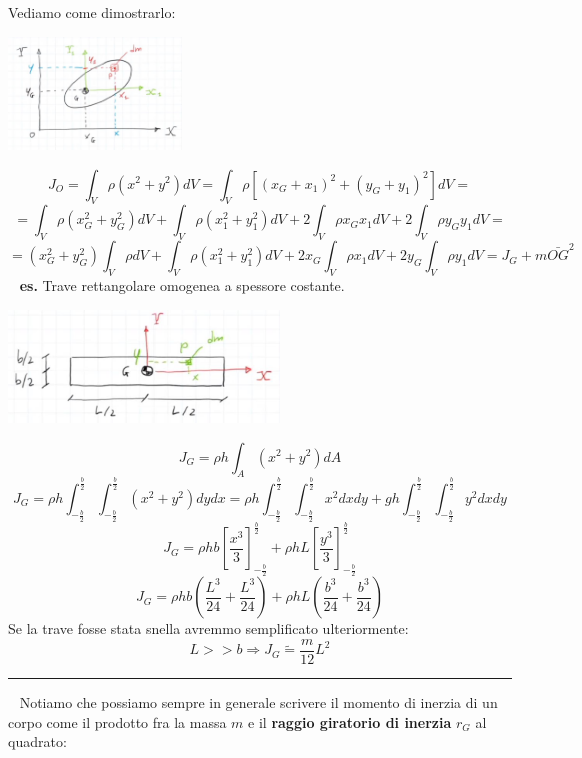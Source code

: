 \newline
Vediamo come dimostrarlo:
\begin{center}
    \includegraphics[height=3cm]{../lezione8/img5.JPG}
\end{center}
\[
    J_O = \int_V \rho(x^2 + y^2) dV = \int_V \rho [(x_G + x_1)^2 + (y_G + y_1)^2] dV = 
\]
\[
    = \int_V \rho(x_G^2 + y_G^2) dV + \int_V \rho(x_1^2 + y_1^2) dV + 2 \int_V \rho x_G x_1 dV + 2 \int_V \rho y_Gy_1 dV = 
\]
\[
    = (x_G^2 + y_G^2)\int_V \rho dV + \int_V \rho(x_1^2 + y_1^2) dV + 2 x_G  \int_V \rho  x_1 dV + 2 y_G \int_V \rho y_1 dV = J_G + m \bar{OG}^2
\]
\ \newline
\textbf{es.} Trave rettangolare omogenea a spessore costante. 
\begin{center}
    \includegraphics[height=3cm]{../lezione8/img6.JPG}
\end{center}
\[
    J_G = \rho h \int_A (x^2 + y^2) dA
\]
\[
    J_G = \rho h \int_{- \frac{b}{2}}^{\frac{b}{2}} \int_{- \frac{b}{2}}^{\frac{b}{2}} (x^2 + y^2) dy dx = \rho h \int_{- \frac{b}{2}}^{\frac{b}{2}} \int_{- \frac{b}{2}}^{\frac{b}{2}} x^2 dx dy + gh \int_{- \frac{b}{2}}^{\frac{b}{2}} \int_{- \frac{b}{2}}^{\frac{b}{2}} y^2 dx dy
\]
\[
    J_G = \rho h b \left[\frac{x^3}{3}\right]_{- \frac{b}{2}}^{\frac{b}{2}} + \rho h L \left[\frac{y^3}{3}\right]_{- \frac{b}{2}}^{\frac{b}{2}}
\]
\[
    J_G = \rho h b \left(\frac{L^3}{24} + \frac{L^3}{24}\right) + \rho h L \left( \frac{b^3}{24} + \frac{b^3}{24}\right)
\]
Se la trave fosse stata snella avremmo semplificato ulteriormente:
\[
    L >> b \Rightarrow J_G \tilde{=} \frac{m}{12} L^2
\]
\rule{\textwidth}{0,4pt}
\ \newline
Notiamo che possiamo sempre in generale scrivere il momento di inerzia di un corpo come il prodotto fra la massa $m$ e il \textbf{raggio giratorio di inerzia} $r_G$ al quadrato:
